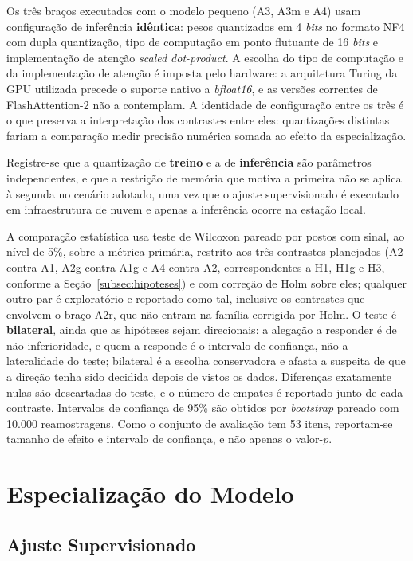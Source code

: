 Os três braços executados com o modelo pequeno (A3, A3m e A4) usam configuração de inferência \textbf{idêntica}: pesos quantizados em 4 \textit{bits} no formato NF4 com dupla quantização, tipo de computação em ponto flutuante de 16 \textit{bits} e implementação de atenção \textit{scaled dot-product}. A escolha do tipo de computação e da implementação de atenção é imposta pelo hardware: a arquitetura Turing da GPU utilizada precede o suporte nativo a \textit{bfloat16}, e as versões correntes de FlashAttention-2 não a contemplam. A identidade de configuração entre os três é o que preserva a interpretação dos contrastes entre eles: quantizações distintas fariam a comparação medir precisão numérica somada ao efeito da especialização.

Registre-se que a quantização de \textbf{treino} e a de \textbf{inferência} são parâmetros independentes, e que a restrição de memória que motiva a primeira não se aplica à segunda no cenário adotado, uma vez que o ajuste supervisionado é executado em infraestrutura de nuvem e apenas a inferência ocorre na estação local.

A comparação estatística usa teste de Wilcoxon pareado por postos com sinal, ao nível de 5\%, sobre a métrica primária, restrito aos três contrastes planejados (A2 contra A1, A2g contra A1g e A4 contra A2, correspondentes a H1, H1g e H3, conforme a Seção~\ref{subsec:hipoteses}) e com correção de Holm sobre eles; qualquer outro par é exploratório e reportado como tal, inclusive os contrastes que envolvem o braço A2r, que não entram na família corrigida por Holm. O teste é \textbf{bilateral}, ainda que as hipóteses sejam direcionais: a alegação a responder é de não inferioridade, e quem a responde é o intervalo de confiança, não a lateralidade do teste; bilateral é a escolha conservadora e afasta a suspeita de que a direção tenha sido decidida depois de vistos os dados. Diferenças exatamente nulas são descartadas do teste, e o número de empates é reportado junto de cada contraste. Intervalos de confiança de 95\% são obtidos por \textit{bootstrap} pareado com 10.000 reamostragens. Como o conjunto de avaliação tem 53 itens, reportam-se tamanho de efeito e intervalo de confiança, e não apenas o valor-$p$.

\section{Especialização do Modelo}
\label{sec:treinamento}

\subsection{Ajuste Supervisionado}
\label{subsec:sft-metodo}

